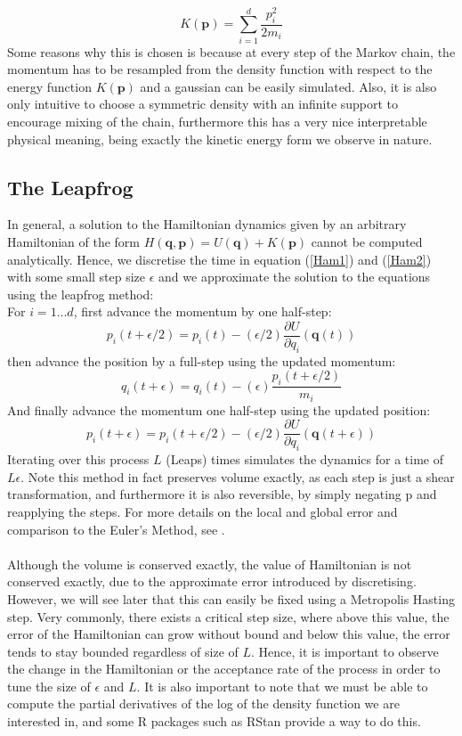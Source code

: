 \documentclass[11pt]{article}
\begin{document}
\begin{equation}
K(\mathbf{p}) = \sum_{i=1}^{d} \frac{p_{i}^{2}}{2m_{i}}
\end{equation}
Some reasons why this is chosen is because at every step of the Markov chain, the momentum has to be resampled from the density function with respect to the energy function $K(\mathbf{p})$ and a gaussian can be easily simulated. Also, it is also only intuitive to choose a symmetric density with an infinite support to encourage mixing of the chain, furthermore this has a very nice interpretable physical meaning, being exactly the kinetic energy form we observe in nature. 
\subsection{The Leapfrog}
In general, a solution to the Hamiltonian dynamics given by an arbitrary Hamiltonian of the form $H(\mathbf{q},\mathbf{p}) = U(\mathbf{q}) + K(\mathbf{p})$ cannot be computed analytically. Hence, we discretise the time in equation (\ref{Ham1}) and (\ref{Ham2}) with some small step size $\epsilon$ and we approximate the solution to the equations using the leapfrog method:
\\ For $i=1\dots d$, first advance the momentum by one half-step:
\begin{equation}
p_{i}(t+\epsilon/2) = p_{i}(t) - (\epsilon/2)\frac{\partial U}{\partial q_{i}}(\mathbf{q}(t))
\end{equation}
then advance the position by a full-step using the updated momentum:
\begin{equation}
q_{i}(t+\epsilon) = q_{i}(t) - (\epsilon)\frac{p_{i}(t+\epsilon/2)}{m_{i}}
\end{equation}
And finally advance the momentum one half-step using the updated position:
\begin{equation}
p_{i}(t+\epsilon) = p_{i}(t+\epsilon/2) - (\epsilon/2)\frac{\partial U}{\partial q_{i}}(\mathbf{q}(t+\epsilon))
\end{equation}
Iterating over this process $L$ (Leaps) times simulates the dynamics for a time of $L\epsilon$.
Note this method in fact preserves volume exactly, as each step is just a shear transformation, and furthermore it is also reversible, by simply negating p and reapplying the steps. For more details on the local and global error and comparison to the Euler's Method, see \cite{neal}.
\\
\\
Although the volume is conserved exactly, the value of Hamiltonian is not conserved exactly, due to the approximate error introduced by discretising. However, we will see later that this can easily be fixed using a Metropolis Hasting step. Very commonly, there exists a critical step size, where above this value, the error of the Hamiltonian can grow without bound and below this value, the error tends to stay bounded regardless of size of $L$. Hence, it is important to observe the change in the Hamiltonian or the acceptance rate of the process in order to tune the size of $\epsilon$ and $L$. It is also important to note that we must be able to compute the partial derivatives of the log of the density function we are interested in, and some R packages such as RStan provide a way to do this.
\end{document}
